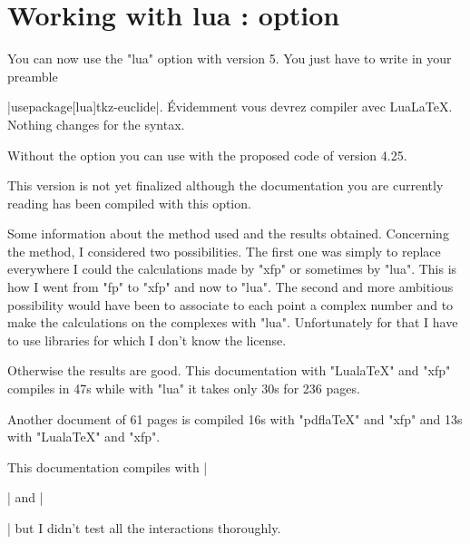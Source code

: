 \newpage
\section{Working with lua : option } \label{calc_with_lua}

You can now use the "lua" option with \tkzname{\tkznameofpack} version 5.
You just have to write in your preamble

 |usepackage[lua]{tkz-euclide}|. 
 Évidemment vous devrez compiler avec LuaLaTeX. Nothing changes for the syntax.

Without the option you can use \tkzname{\tkznameofpack} with the proposed code of version 4.25.

This version is not yet finalized although the documentation you are currently reading has been compiled with this option.

Some information about the method used and the results obtained. Concerning the method, I considered two possibilities. The first one was simply to replace everywhere I could the calculations made by "xfp" or sometimes by "lua". This is how I went from "fp" to "xfp" and now to "lua". The second and more ambitious possibility would have been to associate to each point a complex number and to make the calculations on the complexes with "lua". Unfortunately for that I have to use libraries for which I don't know the license. 

Otherwise the results are good. This documentation with "LualaTeX" and "xfp" compiles in 47s while with "lua" it takes only 30s for 236 pages.

Another document of 61 pages is compiled 16s with "pdflaTeX" and "xfp" and 13s with "LualaTeX" and "xfp".

This documentation compiles with |\usepackage{tkz-base}|  and |\usepackage[lua]{tkz-euclide}| but I didn't test all the interactions thoroughly. 

\endinput